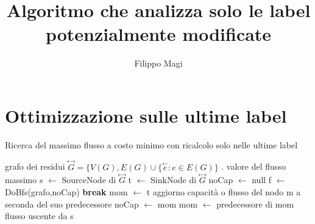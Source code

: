 \documentclass{article}
\title{Algoritmo che analizza solo le label potenzialmente modificate}
\author{Filippo Magi }
\begin{document}
\maketitle

\section{Ottimizzazione sulle ultime label}
\begin{algorithm}
    \caption{Ricerca del massimo flusso a costo minimo con ricalcolo solo nelle ultime label}
    \begin{algorithmic}
    \REQUIRE grafo dei residui $\overset{\leftrightarrow}{G} = \{V(G),E(G) \cup \{ \overset{\leftarrow}{e} : e \in E(G) \}$ .
    \ENSURE valore del flusso massimo
    \STATE s $\leftarrow$ SourceNode di $\overset{\leftrightarrow}{G}$
    \STATE t $\leftarrow$ SinkNode di $\overset{\leftrightarrow}{G}$
    \STATE noCap $\leftarrow$ null
    \LOOP
    \STATE f $\leftarrow$ DoBfs(grafo,noCap)
    \STATE \textbf{break}
    \ENDIF
    \STATE mom $\leftarrow$ t
    \STATE aggiorno capacità o flusso del nodo m a seconda del suo predecessore
    \STATE noCap $\leftarrow$ mom
    \ENDIF
    \STATE mom $\leftarrow$ predecessore di mom
    \ENDWHILE
    \ENDLOOP
    \RETURN flusso uscente da s
    \end{algorithmic}
    \end{algorithm}
    
\end{document}
